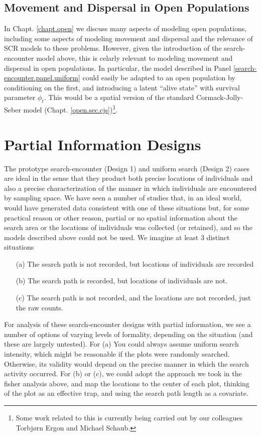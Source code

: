 \subsection{Movement and Dispersal in Open Populations}

In Chapt. \ref{chapt.open} we discuss many aspects of modeling open
populations, including some aspects of modeling movement and dispersal
and the relevance of SCR models to these problems. However, given the
introduction of the search-encounter model above, this is celarly
relevant to modeling movement and dispersal in open populations.  In
particular, the model described in Panel
\ref{search-encounter.panel.uniform} could easily be adapted to an
open population by conditioning on the first, and introducing a latent
``alive state'' with survival parameter $\phi_{t}$. This would be a
spatial version of the standard Cormack-Jolly-Seber model
(Chapt. \ref{open.sec.cjs})\footnote{Some work related to this is
  currently being carried out by our colleagues Torbj{\o}rn Ergon and
  Michael Schaub.}.


\section{Partial Information Designs}

The prototype search-encounter (Design 1) and uniform search (Design
2) cases are ideal in the sense that they product both precise
locations of individuals and also a precise characterization of the
manner in which individuals are encountered by sampling space.  We
have seen a number of studies that, in an ideal world, would have
generated data consistent with one of these situations but, for some
practical reason or other reason, partial or no spatial information
about the search area or the locations of individuals was collected
(or retained), and so the models described above could not be used.
We imagine at least 
3 distinct situations

\begin{itemize}
\item[(a)] The search path is not recorded, but locations  of
  individuals are recorded 
\item[(b)] The search path is recorded, but locations of individuals
  are not.
\item[(c)] The search path is not recorded, and the locations are not
  recorded, just the raw counts.
\end{itemize}

For analysis of these search-encounter designs with partial information,
we see a number of options of varying levels of formality,
depending on the situation (and these are largely untested). 
For (a) You could always assume uniform search intensity,
which might be reasonable if the plots were randomly
searched. Otherwise, its validity would depend on the precise manner
in which the search activity occurred. 
For (b) or (c), we could adopt the approach we took in the fisher analysis
above, and  map the locations to the center of each plot, thinking of
the plot as an effective trap, and using the search path length
as a covariate.

